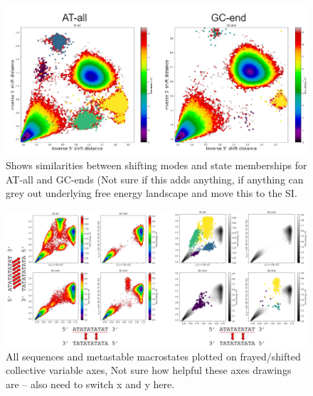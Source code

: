 \documentclass[journal=jpcbfk,manuscript=article]{achemso}
\begin{document}
\begin{figure}[ht!]
	\begin{center}
        \includegraphics[width=\textwidth]{Figs/skeleton/shifting_distribution.PNG}
        \caption{Shows similarities between shifting modes and state memberships for AT-all and GC-ends (Not sure if this adds anything, if anything can grey out underlying free energy landscape and move this to the SI.}
        \label{fig:shifting_distributions}
	\end{center}
\end{figure}

\begin{figure}[ht!]
	\begin{center}
        \includegraphics[width=\textwidth]{Figs/figs_0804/all_seq_physical_cvs_labels.PNG}
        \caption{All sequences and metastable macrostates plotted on frayed/shifted collective variable axes, Not sure how helpful these axes drawings are -- also need to switch x and y here.}
        \label{fig:all_seq_physical_cvs_labels}
	\end{center}
\end{figure}
\end{document}
